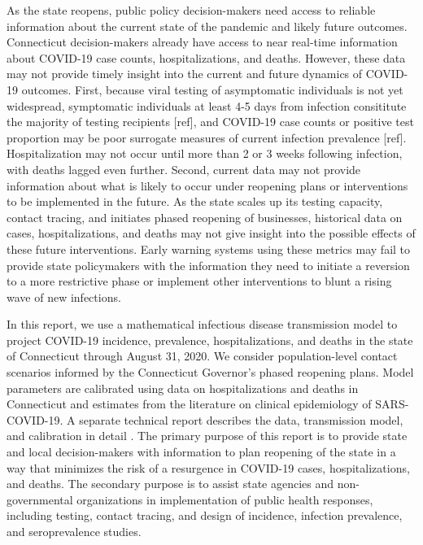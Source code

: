 \documentclass[11pt]{article}
\begin{document}
As the state reopens, public policy decision-makers need access to reliable information about the current state of the pandemic and likely future outcomes.  Connecticut decision-makers already have access to near real-time information about COVID-19 case counts, hospitalizations, and deaths.  However, these data may not provide timely insight into the current and future dynamics of COVID-19 outcomes.  First, because viral testing of asymptomatic individuals is not yet widespread, symptomatic individuals at least 4-5 days from infection consititute the majority of testing recipients [ref], and COVID-19 case counts or positive test proportion may be poor surrogate measures of current infection prevalence [ref].   Hospitalization may not occur until more than 2 or 3 weeks following infection, with deaths lagged even further.  Second, current data may not provide information about what is likely to occur under reopening plans or interventions to be implemented in the future. As the state scales up its testing capacity, contact tracing, and initiates phased reopening of businesses, historical data on cases, hospitalizations, and deaths may not give insight into the possible effects of these future interventions.  Early warning systems using these metrics may fail to provide state policymakers with the information they need to initiate a reversion to a more restrictive phase or implement other interventions to blunt a rising wave of new infections. 



In this report, we use a mathematical infectious disease transmission model to project COVID-19 incidence, prevalence, hospitalizations, and deaths in the state of Connecticut through August 31, 2020.  We consider population-level contact scenarios informed by the Connecticut Governor's phased reopening plans.  Model parameters are calibrated using data on hospitalizations and deaths in Connecticut and estimates from the literature on clinical epidemiology of SARS-COVID-19.  A separate technical report describes the data, transmission model, and calibration in detail \citep{morozova2020tech}.  The primary purpose of this report is to provide state and local decision-makers with information to plan reopening of the state in a way that minimizes the risk of a resurgence in COVID-19 cases, hospitalizations, and deaths.  The secondary purpose is to assist state agencies and non-governmental organizations in implementation of public health responses, including testing, contact tracing, and design of incidence, infection prevalence, and seroprevalence studies. 
\end{document}
